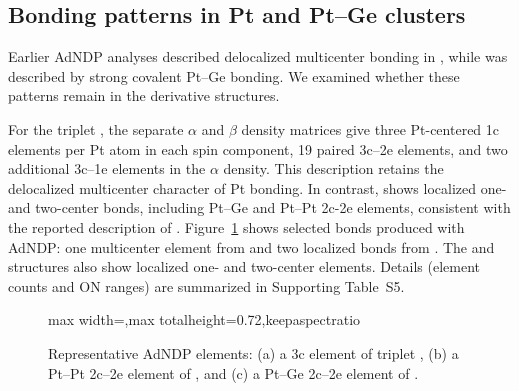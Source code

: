 
\subsection{Bonding patterns in Pt and Pt--Ge clusters}

Earlier AdNDP analyses described delocalized multicenter bonding in
, while  was described by strong covalent Pt--Ge bonding\cite{ugartemendia:2022}. We examined whether
these patterns remain in the derivative structures.

For the triplet , the separate $\alpha$ and $\beta$ density
matrices give three Pt-centered 1c elements per Pt atom in each spin component, 19 paired 3c--2e
elements, and two additional 3c--1e elements in the $\alpha$ density.
This description retains the
delocalized multicenter character of Pt bonding. In
contrast,  shows localized one- and two-center bonds,
including Pt--Ge and Pt--Pt 2c-2e elements, consistent with the reported description
of .  Figure~\ref{fig:tfg_adndp_comparison} shows selected bonds produced with AdNDP: one multicenter element from
 and two localized bonds from . The  and  structures
also show localized one- and two-center elements. Details (element counts and ON ranges)
are summarized in Supporting Table~S5.


\begin{figure}[htbp]
\centering
\begin{adjustbox}{max width=\linewidth,max totalheight=0.72\textheight,keepaspectratio}

\end{adjustbox}
\caption{Representative AdNDP elements: (a) a 3c element of triplet
, (b) a Pt--Pt 2c--2e element of , and
(c) a Pt--Ge 2c--2e element of .}
\label{fig:tfg_adndp_comparison}
\end{figure}

